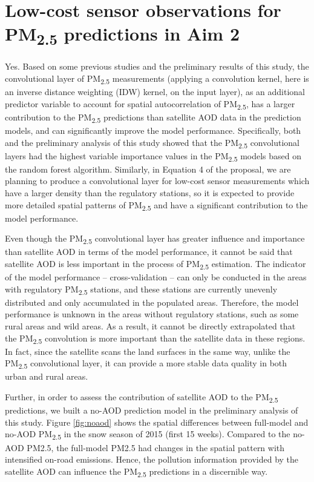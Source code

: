 \documentclass[11pt]{article}
\newcommand{\tsub}{\textsubscript}
\begin{document}
\section{Low-cost sensor observations for \texorpdfstring{PM\tsub{2.5}}{PM2.5} predictions in Aim 2}
\begin{enumerate*}[{[a)]}]
    \item Yes. Based on some previous studies \citep{hu2017estimating, di2016assessing} and the preliminary results of this study, the convolutional layer of PM\tsub{2.5} measurements (applying a convolution kernel, here is an inverse distance weighting (IDW) kernel, on the input layer), as an additional predictor variable to account for spatial autocorrelation of PM\tsub{2.5}, has a larger contribution to the PM\tsub{2.5} predictions than satellite AOD data in the prediction models, and can significantly improve the model performance. Specifically, both \citet{hu2017estimating} and the preliminary analysis of this study showed that the PM\tsub{2.5} convolutional layers had the highest variable importance values in the PM\tsub{2.5} models based on the random forest algorithm. Similarly, in Equation 4 of the proposal, we are planning to produce a convolutional layer for low-cost sensor measurements which have a larger density than the regulatory stations, so it is expected to provide more detailed spatial patterns of PM\tsub{2.5} and have a significant contribution to the model performance. 
    
    \item Even though the PM\tsub{2.5} convolutional layer has greater influence and importance than satellite AOD in terms of the model performance, it cannot be said that satellite AOD is less important in the process of PM\tsub{2.5} estimation. The indicator of the model performance -- cross-validation -- can only be conducted in the areas with regulatory PM\tsub{2.5} stations, and these stations are currently unevenly distributed and only accumulated in the populated areas. Therefore, the model performance is unknown in the areas without regulatory stations, such as some rural areas and wild areas. As a result, it cannot be directly extrapolated that the PM\tsub{2.5} convolution is more important than the satellite data in these regions. In fact, since the satellite scans the land surfaces in the same way, unlike the PM\tsub{2.5} convolutional layer, it can provide a more stable data quality in both urban and rural areas. 
    
    Further, in order to assess the contribution of satellite AOD to the PM\tsub{2.5} predictions, we built a no-AOD prediction model in the preliminary analysis of this study. Figure \ref{fig:noaod} shows the spatial differences between full-model and no-AOD PM\tsub{2.5} in the snow season of 2015 (first 15 weeks). Compared to the no-AOD PM2.5, the full-model PM2.5 had changes in the spatial pattern with intensified on-road emissions. Hence, the pollution information provided by the satellite AOD can influence the PM\tsub{2.5} predictions in a discernible way. 
    

\end{enumerate*}
\end{document}
